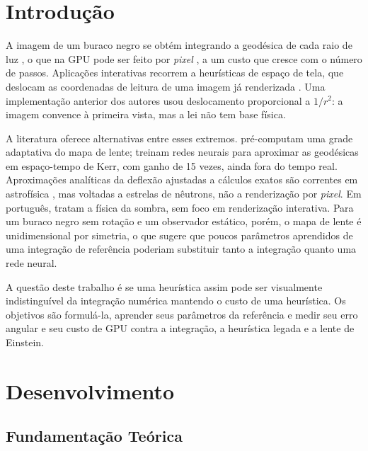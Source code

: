\documentclass[a4paper, 12pt, twoside]{article}
\begin{document}

\section{Introdução}

A imagem de um buraco negro se obtém integrando a geodésica de cada raio
de luz \cite{luminet1979image, james2015interstellar}, o que na GPU pode
ser feito por \emph{pixel} \cite{muller2012thindisc}, a um custo que
cresce com o número de passos. Aplicações interativas recorrem a
heurísticas de espaço de tela, que deslocam as coordenadas de leitura de
uma imagem já renderizada \cite{sousa2005refraction}. Uma implementação
anterior dos autores usou deslocamento proporcional a $1/r^2$: a imagem
convence à primeira vista, mas a lei não tem base física.

A literatura oferece alternativas entre esses extremos.
\textcite{verbraeck2021interactive} pré-computam uma grade adaptativa do
mapa de lente; \textcite{sun2025learning} treinam redes neurais para
aproximar as geodésicas em espaço-tempo de Kerr, com ganho de 15 vezes,
ainda fora do tempo real. Aproximações analíticas da deflexão ajustadas
a cálculos exatos são correntes em astrofísica
\cite{poutanen2020bending}, mas voltadas a estrelas de nêutrons, não a
renderização por \emph{pixel}. Em português,
\textcite{limajunior2021sombras}
tratam a física da sombra, sem foco em renderização interativa. Para um buraco negro sem rotação e
um observador estático, porém, o mapa de lente é unidimensional por
simetria, o que sugere que poucos parâmetros aprendidos de uma
integração de referência poderiam substituir tanto a integração quanto
uma rede neural.

A questão deste trabalho é se uma heurística assim pode ser visualmente
indistinguível da integração numérica mantendo o custo de uma
heurística. Os objetivos são formulá-la, aprender seus parâmetros da
referência e medir seu erro angular e seu custo de GPU contra a
integração, a heurística legada e a lente de Einstein.

\section{Desenvolvimento}

\subsection{Fundamentação Teórica}
\end{document}
